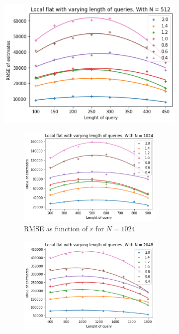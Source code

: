 \documentclass[11pt]{article}
\theoremstyle{definition}
\begin{document}
\begin{figure}[H]
\begin{subfigure}{.4\textwidth}
  \includegraphics[width=\linewidth]{figures/local_flat/varying_r/loc_flat_varying_length_N_poly_=512.png}
  \caption{RMSE as function of $r$ for $N=512$}
  \label{fig:a}
  \begin{subfigure}{\textwidth}
  \centering
  \includegraphics[width=\linewidth]{figures/local_flat/varying_r/loc_flat_varying_length_N_poly_=1024.png}
  \caption{RMSE as function of $r$ for $N=1024$}
  \label{fig:a}
\end{subfigure}
\begin{subfigure}{\textwidth}
  \centering
  \includegraphics[width=\linewidth]{figures/local_flat/varying_r/loc_flat_varying_length_N_poly_=2048.png}

\end{subfigure}
\end{subfigure}
\end{figure}
\end{document}
